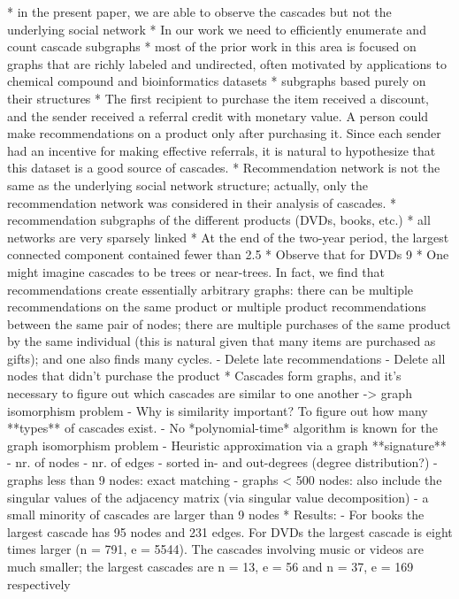 	* in the present paper, we are able to observe the cascades but not the underlying social network
	* In our work we need to efficiently enumerate and count cascade subgraphs
	* most of the prior work in this area is focused on graphs that are richly
	labeled and undirected, often motivated by applications to chemical compound
	and bioinformatics datasets
	* subgraphs based purely on their structures
	* The first recipient to purchase the item received a discount, and the sender received a referral credit with monetary value. A person could make recommendations on a product only after purchasing it. Since each sender had an incentive for making effective referrals, it is natural to hypothesize that this dataset is a good source of cascades.
	* Recommendation network is not the same as the underlying social network structure; actually, only the recommendation network was considered in their analysis of cascades.
	* recommendation subgraphs of the different products (DVDs, books, etc.)
	* all networks are very sparsely linked
	* At the end of the two-year period, the largest connected component contained fewer than 2.5%
	* Observe that for DVDs 9%
	* One might imagine cascades to be trees or near-trees. In fact, we find that recommendations create essentially arbitrary graphs: there can be multiple recommendations on the same product or multiple product recommendations between the same pair of nodes; there are multiple purchases of the same product by the same individual (this is natural given that many items are purchased as gifts); and one also finds many cycles.
	- Delete late recommendations
	- Delete all nodes that didn't purchase the product
	* Cascades form graphs, and it's necessary to figure out which cascades are similar to one another -> graph isomorphism problem
	- Why is similarity important? To figure out how many **types** of cascades exist.
	- No *polynomial-time* algorithm is known for the graph isomorphism problem
	- Heuristic approximation via a graph **signature**
	- nr. of nodes
	- nr. of edges
	- sorted in- and out-degrees (degree distribution?)
	- graphs less than 9 nodes: exact matching
	- graphs < 500 nodes: also include the singular values of the adjacency matrix (via singular value decomposition)
	- a small minority of cascades are larger than 9 nodes
	* Results:
	- For books the largest cascade has 95 nodes and 231 edges. For DVDs the largest cascade is eight times larger (n = 791, e = 5544). The cascades involving music or videos are much smaller; the largest cascades are n = 13, e = 56 and n = 37, e = 169 respectively
